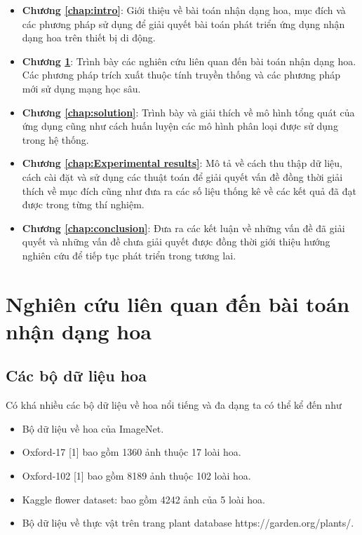 \documentclass[12pt]{report}
\begin{document}
																																																		
		\begin{itemize}
			\item \textbf{Chương \ref{chap:intro}}: Giới thiệu về bài toán nhận dạng hoa, mục đích và các phương pháp sử dụng để giải quyết bài toán phát triển ứng dụng nhận dạng hoa trên thiết bị di động.
			\item \textbf{Chương \ref{chap:background}}: Trình bày các nghiên cứu liên quan đến bài toán nhận dạng hoa. Các phương pháp trích xuất thuộc tính truyền thống và các phương pháp mới sử dụng mạng học sâu.
			\item \textbf{Chương \ref{chap:solution}}: Trình bày và giải thích về mô hình tổng quát của ứng dụng cũng như cách huấn luyện các mô hình phân loại được sử dụng trong hệ thống.
			\item \textbf{Chương \ref{chap:Experimental results}}: Mô tả về cách thu thập dữ liệu, cách cài đặt và sử dụng các thuật toán để giải quyết vấn đề đồng thời giải thích về mục đích cũng như đưa ra các số liệu thống kê về các kết quả đã đạt được trong từng thí nghiệm. 
			\item \textbf{Chương \ref{chap:conclusion}}: Đưa ra các kết luận về những vấn đề đã giải quyết và những vấn đề chưa giải quyết được đồng thời giới thiệu hướng nghiên cứu để tiếp tục phát triển trong tương lai.	      
		\end{itemize}
																																																				
																																																
																																																		
																																																		
		\newpage	
		\chapter{Nghiên cứu liên quan đến bài toán nhận dạng hoa}
		\label{chap:background}
																																																						
																																																								
		\section{Các bộ dữ liệu hoa}
		Có khá nhiều các bộ dữ liệu về hoa nổi tiếng và đa dạng ta có thể kể đến như	
		\begin{itemize}
			\item Bộ dữ liệu về hoa của ImageNet.
			\item Oxford-17 [1] bao gồm 1360 ảnh thuộc 17 loài hoa.
			\item Oxford-102 [1] bao gồm 8189 ảnh thuộc 102 loài hoa. 
			\item Kaggle flower dataset: bao gồm 4242 ảnh của 5 loài hoa.
			\item Bộ dữ liệu về thực vật trên trang plant database https://garden.org/plants/.
		\end{itemize}		
																																																				
\end{document}
